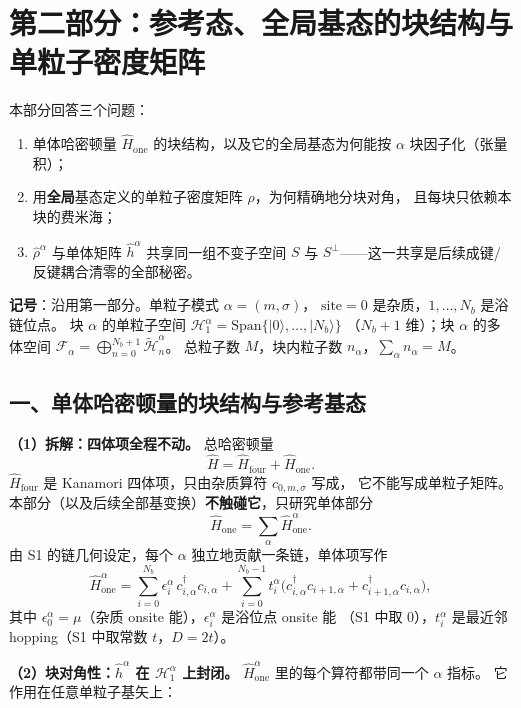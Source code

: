 \documentclass[11pt]{ctexart}
\begin{document}
\section*{第二部分：参考态、全局基态的块结构与单粒子密度矩阵}

\noindent 本部分回答三个问题：
\begin{enumerate}
\item 单体哈密顿量 $\hat H_{\mathrm{one}}$ 的块结构，以及它的全局基态为何能按
$\alpha$ 块因子化（张量积）；
\item 用\textbf{全局}基态定义的单粒子密度矩阵 $\rho$，为何精确地分块对角，
且每块只依赖本块的费米海；
\item $\hat\rho^\alpha$ 与单体矩阵 $\hat h^\alpha$ 共享同一组不变子空间
$S$ 与 $S^{\perp}$——这一共享是后续成键/反键耦合清零的全部秘密。
\end{enumerate}

\medskip
\noindent\textbf{记号}：沿用第一部分。单粒子模式 $\alpha=(m,\sigma)$，
$\mathrm{site}=0$ 是杂质，$1,\dots,N_b$ 是浴链位点。
块 $\alpha$ 的单粒子空间 $\mathcal{H}_1^\alpha=\mathrm{Span}\{|0\rangle,\dots,|N_b\rangle\}$
（$N_b+1$ 维）；块 $\alpha$ 的多体空间
$\mathcal{F}_\alpha=\bigoplus_{n=0}^{N_b+1}\tilde{\mathcal{H}}_n^\alpha$。
总粒子数 $M$，块内粒子数 $n_\alpha$，$\sum_\alpha n_\alpha=M$。

\subsection{一、单体哈密顿量的块结构与参考基态}

\textbf{（1）拆解：四体项全程不动。}
总哈密顿量
\[
\hat H=\hat H_{\mathrm{four}}+\hat H_{\mathrm{one}}.
\]
$\hat H_{\mathrm{four}}$ 是 Kanamori 四体项，只由杂质算符 $c_{0,m,\sigma}$ 写成，
它不能写成单粒子矩阵。本部分（以及后续全部基变换）\textbf{不触碰它}，只研究单体部分
\[
\hat H_{\mathrm{one}}=\sum_{\alpha}\hat H_{\mathrm{one}}^{\alpha}.
\]
由 S1 的链几何设定，每个 $\alpha$ 独立地贡献一条链，单体项写作
\[
\hat H_{\mathrm{one}}^{\alpha}
=
\sum_{i=0}^{N_b}\epsilon_i^{\alpha}\,c_{i,\alpha}^{\dagger}c_{i,\alpha}
+\sum_{i=0}^{N_b-1}t^{\alpha}_i\Big(c_{i,\alpha}^{\dagger}c_{i+1,\alpha}
+c_{i+1,\alpha}^{\dagger}c_{i,\alpha}\Big),
\]
其中 $\epsilon_0^{\alpha}=\mu$（杂质 onsite 能），$\epsilon_i^{\alpha}$ 是浴位点 onsite 能
（S1 中取 $0$），$t^{\alpha}_i$ 是最近邻 hopping（S1 中取常数 $t$，$D=2t$）。

\textbf{（2）块对角性：$\hat h^\alpha$ 在 $\mathcal{H}_1^\alpha$ 上封闭。}
$\hat H_{\mathrm{one}}^{\alpha}$ 里的每个算符都带同一个 $\alpha$ 指标。
它作用在任意单粒子基矢上：
\end{document}
